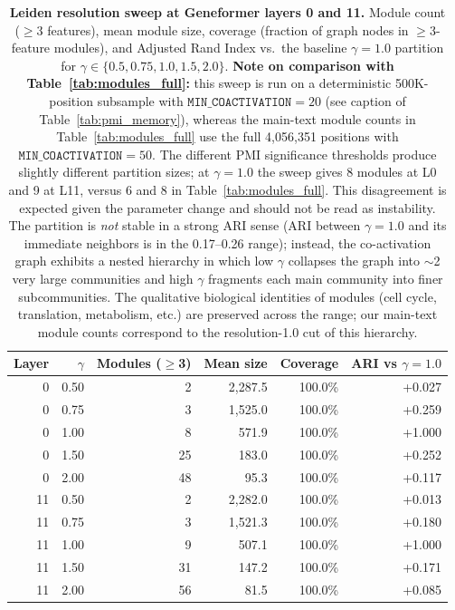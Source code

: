 \documentclass[onecolumn]{article}
\begin{document}
\begin{table}[H]
\centering
\caption{\textbf{Leiden resolution sweep at Geneformer layers 0 and 11.} Module count ($\geq$3 features), mean module size, coverage (fraction of graph nodes in $\geq$3-feature modules), and Adjusted Rand Index vs.\ the baseline $\gamma{=}1.0$ partition for $\gamma \in \{0.5, 0.75, 1.0, 1.5, 2.0\}$. \textbf{Note on comparison with Table~\ref{tab:modules_full}:} this sweep is run on a deterministic 500K-position subsample with $\texttt{MIN\_COACTIVATION}{=}20$ (see caption of Table~\ref{tab:pmi_memory}), whereas the main-text module counts in Table~\ref{tab:modules_full} use the full 4{,}056{,}351 positions with $\texttt{MIN\_COACTIVATION}{=}50$. The different PMI significance thresholds produce slightly different partition sizes; at $\gamma{=}1.0$ the sweep gives 8 modules at L0 and 9 at L11, versus 6 and 8 in Table~\ref{tab:modules_full}. This disagreement is expected given the parameter change and should not be read as instability. The partition is \emph{not} stable in a strong ARI sense (ARI between $\gamma{=}1.0$ and its immediate neighbors is in the 0.17--0.26 range); instead, the co-activation graph exhibits a nested hierarchy in which low $\gamma$ collapses the graph into $\sim$2 very large communities and high $\gamma$ fragments each main community into finer subcommunities. The qualitative biological identities of modules (cell cycle, translation, metabolism, etc.) are preserved across the range; our main-text module counts correspond to the resolution-1.0 cut of this hierarchy.}
\label{tab:leiden_sweep}
\smallskip
\small
\begin{tabular}{rrrrrr}
\toprule
Layer & $\gamma$ & Modules ($\geq$3) & Mean size & Coverage & ARI vs $\gamma{=}1.0$ \\
\midrule
0  & 0.50 &  2 & 2{,}287.5 & 100.0\% & +0.027 \\
0  & 0.75 &  3 & 1{,}525.0 & 100.0\% & +0.259 \\
0  & 1.00 &  8 &    571.9 & 100.0\% & +1.000 \\
0  & 1.50 & 25 &    183.0 & 100.0\% & +0.252 \\
0  & 2.00 & 48 &     95.3 & 100.0\% & +0.117 \\
\midrule
11 & 0.50 &  2 & 2{,}282.0 & 100.0\% & +0.013 \\
11 & 0.75 &  3 & 1{,}521.3 & 100.0\% & +0.180 \\
11 & 1.00 &  9 &    507.1 & 100.0\% & +1.000 \\
11 & 1.50 & 31 &    147.2 & 100.0\% & +0.171 \\
11 & 2.00 & 56 &     81.5 & 100.0\% & +0.085 \\
\bottomrule
\end{tabular}
\end{table}
\end{document}
